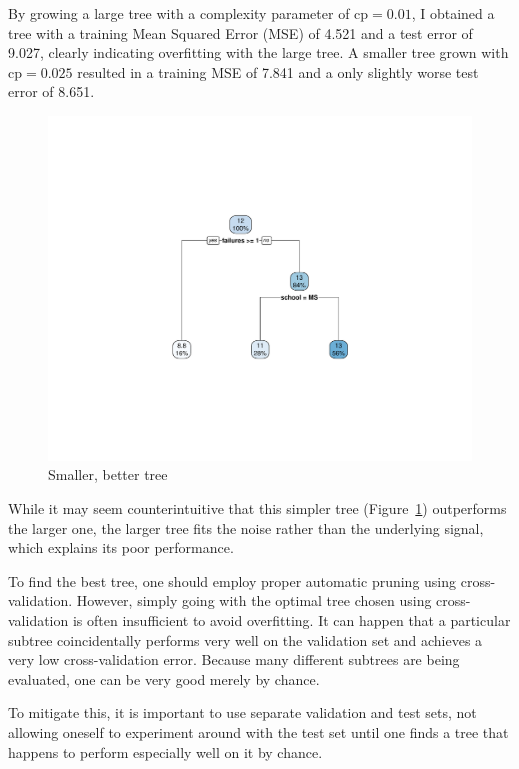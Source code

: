 \documentclass[12pt]{article}
\begin{document}
By growing a large tree with a complexity parameter of \( \text{cp} = 0.01 \), I obtained a tree with a training Mean Squared Error (MSE) of 4.521 and a test error of 9.027, clearly indicating overfitting with the large tree. A smaller tree grown with \( \text{cp} = 0.025 \) resulted in a training MSE of 7.841 and a only slightly worse test error of 8.651.

\begin{figure}
    \centering
    \includegraphics[scale=0.30]{small_manual_tree.pdf}
    \caption{Smaller, better tree}
    \label{small_tree}
\end{figure}

While it may seem counterintuitive that this simpler tree (Figure~\ref{small_tree}) outperforms the larger one, the larger tree fits the noise rather than the underlying signal, which explains its poor performance.

To find the best tree, one should employ proper automatic pruning using cross-validation. However, simply going with the optimal tree chosen using cross-validation is often insufficient to avoid overfitting. It can happen that a particular subtree coincidentally performs very well on the validation set and achieves a very low cross-validation error. Because many different subtrees are being evaluated, one can be very good merely by chance.

To mitigate this, it is important to use separate validation and test sets, not allowing oneself to experiment around with the test set until one finds a tree that happens to perform especially well on it by chance.
\end{document}
